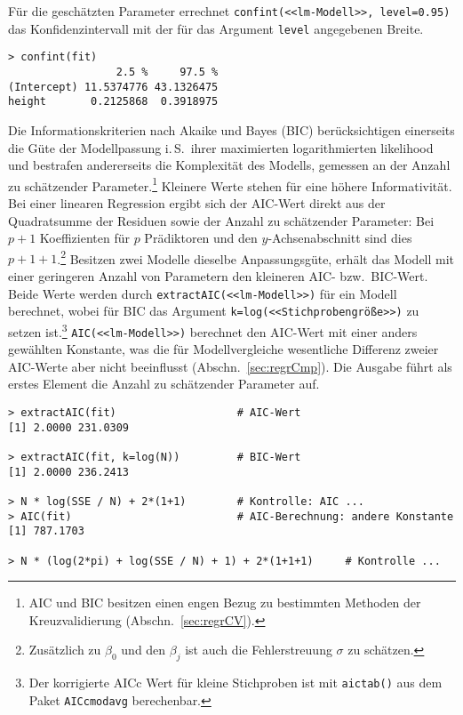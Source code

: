 Für die geschätzten Parameter errechnet \lstinline!confint(<<lm-Modell>>, level=0.95)! das Konfidenzintervall mit der für das Argument \lstinline!level! angegebenen Breite.
\begin{lstlisting}
> confint(fit)
                 2.5 %     97.5 %
(Intercept) 11.5374776 43.1326475
height       0.2125868  0.3918975
\end{lstlisting}

Die Informationskriterien nach Akaike und Bayes (BIC) berücksichtigen einerseits die Güte der Modellpassung i.\,S.\ ihrer maximierten logarithmierten likelihood und bestrafen andererseits die Komplexität des Modells, gemessen an der Anzahl zu schätzender Parameter.\footnote{AIC und BIC besitzen einen engen Bezug zu bestimmten Methoden der Kreuzvalidierung (Abschn.\ \ref{sec:regrCV}).} Kleinere Werte stehen für eine höhere Informativität. Bei einer linearen Regression ergibt sich der AIC-Wert direkt aus der Quadratsumme der Residuen sowie der Anzahl zu schätzender Parameter: Bei $p+1$ Koeffizienten für $p$ Prädiktoren und den $y$-Achsenabschnitt sind dies $p+1+1$.\footnote{Zusätzlich zu $\beta_{0}$ und den $\beta_{j}$ ist auch die Fehlerstreuung $\sigma$ zu schätzen.} Besitzen zwei Modelle dieselbe Anpassungsgüte, erhält das Modell mit einer geringeren Anzahl von Parametern den kleineren AIC- bzw.\ BIC-Wert. Beide Werte werden durch \lstinline!extractAIC(<<lm-Modell>>)! für ein Modell berechnet, wobei für BIC das Argument \lstinline!k=log(<<Stichprobengröße>>)! zu setzen ist.\footnote{Der korrigierte AICc Wert für kleine Stichproben ist mit  \lstinline!aictab()! aus dem Paket  \lstinline!AICcmodavg! \cite{Mazerolle2013} berechenbar.} \lstinline!AIC(<<lm-Modell>>)! berechnet den AIC-Wert mit einer anders gewählten Konstante, was die für Modellvergleiche wesentliche Differenz zweier AIC-Werte aber nicht beeinflusst (Abschn.\ \ref{sec:regrCmp}). Die Ausgabe führt als erstes Element die Anzahl zu schätzender Parameter auf.
\begin{lstlisting}
> extractAIC(fit)                   # AIC-Wert
[1] 2.0000 231.0309

> extractAIC(fit, k=log(N))         # BIC-Wert
[1] 2.0000 236.2413

> N * log(SSE / N) + 2*(1+1)        # Kontrolle: AIC ...
> AIC(fit)                          # AIC-Berechnung: andere Konstante
[1] 787.1703

> N * (log(2*pi) + log(SSE / N) + 1) + 2*(1+1+1)     # Kontrolle ...
\end{lstlisting}


